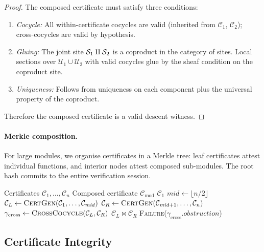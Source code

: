 \documentclass[11pt]{article}
\newcommand{\CertGen}{\textsc{CertGen}}
\newcommand{\ProofCert}{\mathcal{C}}
\newcommand{\CoverFam}{\mathcal{U}}
\newcommand{\Cocycle}{\gamma}
\newcommand{\CertCompose}{\bowtie}
\begin{document}
\begin{proof}
The composed certificate must satisfy three conditions:
\begin{enumerate}[noitemsep]
  \item \emph{Cocycle:} All within-certificate cocycles are valid
    (inherited from $\ProofCert_1$, $\ProofCert_2$); cross-cocycles
    are valid by hypothesis.
  \item \emph{Gluing:} The joint site $\mathcal{S}_1 \amalg \mathcal{S}_2$ is a
    coproduct in the category of sites.  Local sections over
    $\CoverFam_1 \cup \CoverFam_2$ with valid cocycles glue by the
    sheaf condition on the coproduct site.
  \item \emph{Uniqueness:} Follows from uniqueness on each component
    plus the universal property of the coproduct.
\end{enumerate}
Therefore the composed certificate is a valid descent witness.
\end{proof}

\paragraph{Merkle composition.}
For large modules, we organise certificates in a Merkle tree:
leaf certificates attest individual functions, and interior nodes
attest composed sub-modules.  The root hash commits to the entire
verification session.

\begin{algorithm}[t]
\caption{\CertGen: Certificate composition}\label{alg:cert-compose}
\begin{algorithmic}[1]
\REQUIRE Certificates $\ProofCert_1, \ldots, \ProofCert_n$
\ENSURE Composed certificate $\ProofCert_{\mathrm{mod}}$
  \RETURN $\ProofCert_1$
\ENDIF
\STATE $\mathit{mid} \leftarrow \lfloor n/2 \rfloor$
\STATE $\ProofCert_L \leftarrow \CertGen(\ProofCert_1, \ldots, \ProofCert_{\mathit{mid}})$
\STATE $\ProofCert_R \leftarrow \CertGen(\ProofCert_{\mathit{mid}+1}, \ldots, \ProofCert_n)$
\STATE $\Cocycle_{\mathrm{cross}} \leftarrow \textsc{CrossCocycle}(\ProofCert_L, \ProofCert_R)$
\IF{$\Cocycle_{\mathrm{cross}}.\textit{valid}$}
  \RETURN $\ProofCert_L \CertCompose \ProofCert_R$
\ELSE
  \RETURN \textsc{Failure}($\Cocycle_{\mathrm{cross}}.\textit{obstruction}$)
\ENDIF
\end{algorithmic}
\end{algorithm}

\subsection{Certificate Integrity}\label{sec:integrity}
\end{document}
